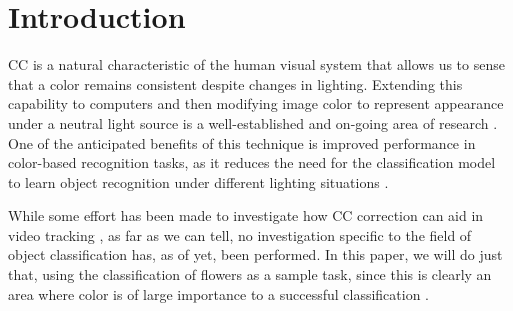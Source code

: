 \section{Introduction}

\gls{CC} is a natural characteristic of the human visual system that allows us to sense
that a color remains consistent despite changes in lighting. Extending this capability to computers
and then modifying image color to represent appearance under a neutral light source is a well-established
and on-going area of research \cite{FOSTER2011674}. One of the anticipated benefits of this technique is improved performance
in color-based recognition tasks, as it reduces the need for the classification model to learn object
recognition under different lighting situations \cite{Kasaei_Ghorbani_Schilperoort_vanderRest_2021}.

While some effort has been made to investigate how \gls{CC} correction can aid in video tracking
\cite{Agarwal2006}, as far as we can tell, no investigation specific to the field of object
classification has, as of yet, been performed. In this paper, we will do just that, using the
classification of flowers as a sample task, since this is clearly an area where color is of large
importance to a successful classification \cite{LU2021110082}.

